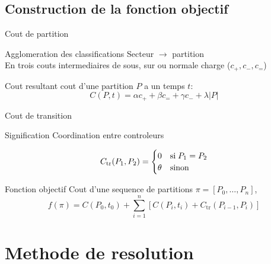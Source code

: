 \documentclass[tikz]{beamer}
\begin{document}
\subsection{Construction de la fonction objectif}
\begin{frame}{Cout de partition}
  \begin{block}{Agglomeration des classifications}
    Secteur \(\to\) partition\\
    En trois couts intermediaires de sous, sur ou normale charge (\(c_+, c_-,
    c_=\))
  \end{block}
  \begin{block}{Cout resultant}
    cout d'une partition \(P\) a un temps \(t\):
    \begin{equation}
      C(P,t) = \alpha c_+ + \beta c_= + \gamma c_- + \lambda \vert P \vert
    \end{equation}
  \end{block}
\end{frame}
\begin{frame}[c]{Cout de transition}
  \begin{block}{Signification}
  Coordination entre controleurs
  \end{block}
  \begin{equation}
    C_\text{tr}(P_1, P_2) =
    \begin{cases}
      0 & \text{si\;} P_1 = P_2\\
      \theta & \text{sinon}
    \end{cases}
  \end{equation}
\end{frame}
\begin{frame}[c]{Fonction objectif}
  Cout d'une sequence de partitions \(\pi = [P_0, \dots, P_n]\),
  \begin{equation}
    f(\pi) = C(P_0, t_0) + \sum_{i=1}^n \left[
      C(P_i, t_i) + C_\text{tr}(P_{i-1}, P_i)
    \right]
  \end{equation}
\end{frame}

\section{Methode de resolution}
\end{document}
